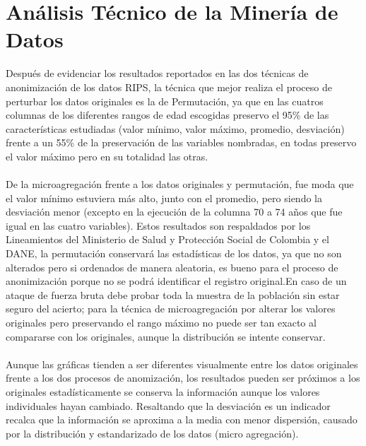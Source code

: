 \documentclass[a4paper,openright,12pt]{book}
\theoremstyle{definition}
\theoremstyle{remark}
\begin{document}
\section{Análisis Técnico de la Minería de Datos}
Después de evidenciar los resultados reportados en las dos técnicas de anonimización de los datos RIPS, la técnica que mejor realiza el proceso de perturbar los datos originales es la de Permutación, ya que en las cuatros columnas de los diferentes rangos de edad escogidas preservo el 95\% de las características estudiadas (valor mínimo, valor máximo, promedio, desviación) frente a un 55\% de la preservación de las variables nombradas, en todas preservo el valor máximo pero en su totalidad las otras.\\\\
De la microagregación frente a los datos originales y permutación, fue moda que el valor mínimo estuviera más alto, junto con el promedio, pero siendo la desviación menor (excepto en la ejecución de la columna 70 a 74 años que fue igual en las cuatro variables). Estos resultados son respaldados por los Lineamientos del Ministerio de Salud y Protección Social de Colombia y el DANE, la permutación conservará las estadísticas de los datos, ya que no son alterados pero si ordenados de manera aleatoria, es bueno para el proceso de anonimización porque no se podrá identificar el registro original.En caso de un ataque de fuerza bruta debe probar toda la muestra de la población sin estar seguro del acierto; para la técnica de microagregación por alterar los valores originales pero preservando el rango máximo no puede ser tan exacto al compararse con los originales, aunque la distribución se intente conservar.\\\\Aunque las gráficas tienden a ser diferentes visualmente entre los datos originales frente a los dos procesos de anomización, los resultados pueden ser próximos a los originales  estadísticamente se conserva la información aunque los valores individuales hayan cambiado. Resaltando que la desviación es un indicador recalca que la información se aproxima a la media con menor dispersión, causado por la distribución y estandarizado de los datos (micro agregación).
\end{document}
